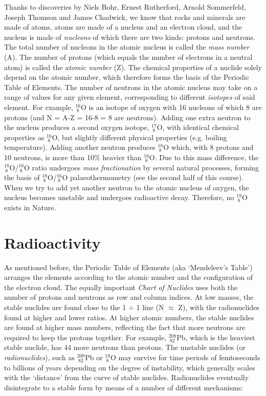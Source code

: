 \documentclass{book}
\begin{document}
Thanks to discoveries by Niels Bohr, Ernest Rutherford, Arnold
Sommerfeld, Joseph Thomson and James Chadwick, we know that rocks and
minerals are made of atoms, atoms are made of a nucleus and an
electron cloud, and the nucleus is made of \emph{nucleons} of which
there are two kinds: protons and neutrons. The total number of
nucleons in the atomic nucleus is called the \emph{mass number}
(A). The number of protons (which equals the number of electrons in a
neutral atom) is called the \emph{atomic number} (Z). The chemical
properties of a nuclide solely depend on the atomic number, which
therefore forms the basis of the Periodic Table of Elements. The
number of neutrons in the atomic nucleus may take on a range of values
for any given element, corresponding to different \emph{isotopes} of
said element. For example, $^{16}_{~8}$O is an isotope of oxygen with
16 nucleons of which 8 are protons (and N = A-Z = 16-8 = 8 are
neutrons). Adding one extra neutron to the nucleus produces a second
oxygen isotope, $^{17}_{~8}$O, with identical chemical properties as
$^{16}_{~8}$O, but slightly different physical properties
(e.g. boiling temperature).  Adding another neutron produces
$^{18}_{~8}$O which, with 8 protons and 10 neutrons, is more than 10\%
heavier than $^{16}_{~8}$O. Due to this mass difference, the
$^{18}_{~8}$O/$^{16}_{~8}$O ratio undergoes \emph{mass fractionation}
by several natural processes, forming the basis of
$^{18}_{~8}$O/$^{16}_{~8}$O palaeothermometry (see the second half of
this course). When we try to add yet another neutron to the atomic
nucleus of oxygen, the nucleus becomes unstable and undergoes
radioactive decay.  Therefore, no $^{19}_{~8}$O exists in Nature.

\section{Radioactivity}
\label{sec:radioactivity}

As mentioned before, the Periodic Table of Elements (aka
`Men\-de\-le\-ev's Table') arranges the elements according to the
atomic number and the configuration of the electron cloud. The equally
important \emph{Chart of Nuclides} uses both the number of protons and
neutrons as row and column indices. At low masses, the stable nuclides
are found close to the 1 $\div$ 1 line (N $\approx$ Z), with the
radionuclides found at higher and lower ratios. At higher atomic
numbers, the stable nuclides are found at higher mass numbers,
reflecting the fact that more neutrons are required to keep the
protons together. For example, $^{208}_{~82}$Pb, which is the heaviest
stable nuclide, has 44 more neutrons than protons. The unstable
nuclides (or \emph{radionuclides}), such as $^{209}_{~82}$Pb or
$^{19}_{~8}$O may survive for time periods of femtoseconds to billions
of years depending on the degree of instability, which generally
scales with the `distance' from the curve of stable
nuclides. Radionuclides eventually disintegrate to a stable form by
means of a number of different mechanisms:
\end{document}
